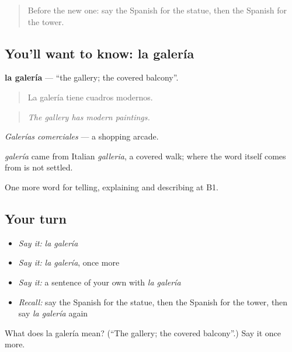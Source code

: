 \label{lesson:ES-C678-galeria}



\begin{quote}
Before the new one: say the Spanish for the statue, then the Spanish for the tower.
\end{quote}

\subsection*{You'll want to know: la galería}
\textbf{la galería} — \textquotedblleft{}the gallery; the covered balcony\textquotedblright{}.

\begin{quote}
La galería tiene cuadros modernos.
\end{quote}

\begin{quote}
\emph{The gallery has modern paintings.}
\end{quote}

\emph{Galerías comerciales} — a shopping arcade.

\begin{cousinweb}
\emph{galería} came from Italian \emph{galleria}, a covered walk; where the word itself comes from is not settled.
\end{cousinweb}

\begin{grammarlens}[title={What you've built}]
One more word for telling, explaining and describing at B1.
\end{grammarlens}

\subsection*{Your turn}
\begin{itemize}
\raggedright
  \item \emph{Say it:} \emph{la galería}
  \item \emph{Say it:} \emph{la galería}, once more
  \item \emph{Say it:} a sentence of your own with \emph{la galería}
  \item \emph{Recall:} say the Spanish for the statue, then the Spanish for the tower, then say \emph{la galería} again
\end{itemize}

\begin{tcolorbox}[breakable,colback=teal!4,colframe=teal!35!black,title={Before you move on}]
What does la galería mean? (\textquotedblleft{}The gallery; the covered balcony\textquotedblright{}.) Say it once more.
\end{tcolorbox}
